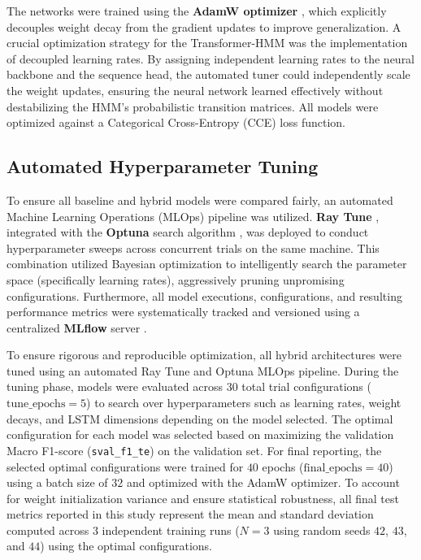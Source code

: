 The networks were trained using the \textbf{AdamW optimizer} \cite{loshchilov2017decoupled},
which explicitly decouples weight decay from the gradient updates to improve generalization.
A crucial optimization strategy for the Transformer-HMM was the implementation of decoupled learning rates.
By assigning independent learning rates to the neural backbone and the sequence head, the automated tuner could independently scale the weight updates,
ensuring the neural network learned effectively without destabilizing the HMM's probabilistic transition matrices.
All models were optimized against a Categorical Cross-Entropy (CCE) loss function.

\subsection{Automated Hyperparameter Tuning}
To ensure all baseline and hybrid models were compared fairly, an automated Machine Learning Operations (MLOps) pipeline was utilized.
\textbf{Ray Tune} \cite{liaw2018tune}, integrated with the \textbf{Optuna} search algorithm \cite{akiba2019optuna},
was deployed to conduct hyperparameter sweeps across concurrent trials on the same machine.
This combination utilized Bayesian optimization to intelligently search the parameter space (specifically learning rates),
aggressively pruning unpromising configurations.
Furthermore, all model executions, configurations, and resulting performance metrics were systematically tracked and
versioned using a centralized \textbf{MLflow} server \cite{zaharia2018accelerating}.

To ensure rigorous and reproducible optimization, all hybrid architectures were tuned using an automated Ray Tune and Optuna MLOps pipeline.
During the tuning phase, models were evaluated across $30$ total trial configurations ($\text{tune\_epochs} = 5$)
to search over hyperparameters such as learning rates, weight decays, and LSTM dimensions depending on the model selected.
The optimal configuration for each model was selected based on maximizing the validation Macro F1-score (\texttt{sval\_f1\_te}) on the validation set. 
For final reporting, the selected optimal configurations were trained for $40$ epochs ($\text{final\_epochs} = 40$) using a
batch size of $32$ and optimized with the AdamW optimizer.
To account for weight initialization variance and ensure statistical robustness, all final test metrics reported in this study represent the mean and standard
deviation computed across $3$ independent training runs ($N=3$ using random seeds $42$, $43$, and $44$) using the optimal configurations.

